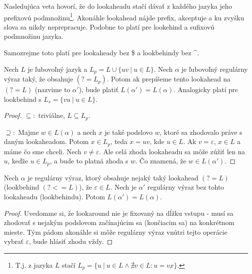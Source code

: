 \documentclass{svk_long_sk}
\begin{document}
Nasledujúca veta hovorí, že do lookaheadu stačí dávať z každého jazyka jeho prefixovú podmnožinu\footnote{T.j. z jazyka $L$ stačí $L_p=\lbrace u~|~ u\in L \wedge \nexists v \in L: u = vx \rbrace$.}. Akonáhle lookahead nájde prefix, akceptuje a ku zvyšku slova sa nikdy neprepracuje. Podobne to platí pre lookehind a sufixovú podmnožinu jazyka.

Samozrejme toto platí pre lookaheady bez \$ a look\-behindy bez \textasciicircum.
\begin{theorem}\label{bezprefixove}
Nech $L$ je ľubovoľný jazyk a $L_p = L \cup \lbrace uv ~|~ u \in L \rbrace$. Nech $\alpha$ je ľubovoľný regulárny výraz taký, že obsahuje $(?=L_p)$. Potom ak prepíšeme tento lookahead na $(?=L)$ (nazvime to $\alpha '$), bude platiť $L(\alpha ') = L(\alpha )$. Analogicky platí pre lookbehind s $L_s=\lbrace vu ~|~ u\in L\rbrace$.
\end{theorem}
\begin{proof}
$\subseteq :$ triviálne,  $L \subseteq L_p$.

$\supseteq :$ Majme $w \in L(\alpha)$ a nech $x$ je také podslovo $w$, ktoré sa zhodovalo práve s daným lookaheadom. Potom $x \in L_p$, teda $x=uv$, kde $u \in L$. Ak $v=\varepsilon$, $x \in L$ a máme čo sme chceli. Nech $v\neq \varepsilon$. Ale celá zhoda lookaheadu sa môže zúžiť len na $u$, keďže $u \in L_p$, a bude to platná zhoda s $w$. Čo znamená, že $w \in L(\alpha ')$.
\end{proof}

\begin{corollary}
Nech $\alpha$ je regulárny výraz, ktorý obsahuje nejaký taký lookahead $(?=L)$ (lookbehind $(?<=L)$), že $\varepsilon \in L$. Nech je $\alpha '$ regulárny výraz bez tohto lookaheadu (lookbehindu). Potom $L(\alpha ') = L(\alpha)$.
\end{corollary}
\begin{proof}
Uvedomme si, že lookaround nie je fixovaný na dĺžku vstupu - musí sa zhodovať s nejakým podslovom začínajúcim sa (končiacim sa) na konkrétnom mieste. Tým pádom akonáhle si môže regulárny výraz vnútri tejto operácie vybrať $\varepsilon$, bude hlásiť zhodu vždy.
\end{proof}
\end{document}
